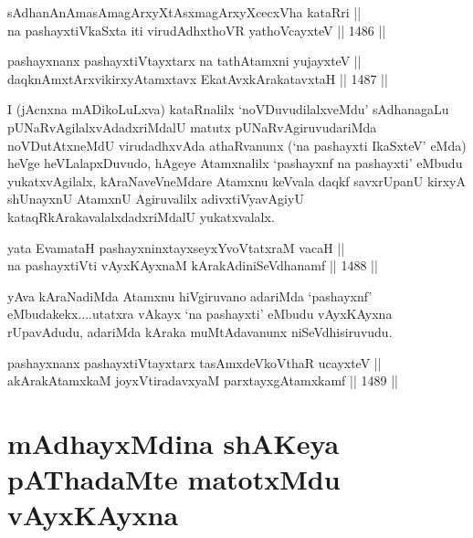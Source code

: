 \begin{shl}
sAdhanAnAmasAmagArxyXtAsxmagArxyXcecxVha kataRri || \\
na pashayxtiVkaSxta iti virudAdhxthoVR yathoVcayxteV ||  1486 ||  
\end{shl}
				
\begin{shl}
pashayxnanx pashayxtiVtayxtarx na tathA\s \s tamxni yujayxteV ||  \\
daqknAmxtArxvikirxyAtamxtavx EkatAvxkArakatavxtaH ||  1487 ||  
\end{shl}

\begin{artha}
I (jAcnxna mADikoLuLxva) kataRnalilx `noVDuvudilalxveMdu' sAdhanagaLu pUNaRvAgilalxvAdadxriMdalU matutx pUNaRvAgiruvudariMda noVDutAtxneMdU virudadhxvAda athaRvanunx (`na pashayxti IkaSxteV' eMda) heVge heVLalapxDuvudo, hAgeye Atamxnalilx `pashayxnf na pashayxti' eMbudu yukatxvAgilalx, kAraNaveVneMdare Atamxnu keVvala daqkf savxrUpanU kirxyA shUnayxnU AtamxnU Agiruvalilx adivxtiVyavAgiyU kataqRkArakavalalxdadxriMdalU yukatxvalalx.
\end{artha}


\begin{shl}
yata EvamataH pashayxninxtayxseyxYvoVtatxraM vacaH || \\
na pashayxtiVti vAyxKAyxnaM kArakAdiniSeVdhanamf ||  1488 ||  
\end{shl}

\begin{artha}
yAva kAraNadiMda Atamxnu hiVgiruvano adariMda `pashayxnf' eMbudakekx....utatxra vAkayx `na pashayxti' eMbudu vAyxKAyxna rUpavAdudu, adariMda kAraka muMtAdavanunx niSeVdhisiruvudu.
\end{artha}

\begin{shl}
pashayxnanx pashayxtiVtayxtarx tasAmxdeVkoV\s thaR ucayxteV ||  \\
akArakAtamxkaM joyxVtiradavxyaM parxtayxgAtamxkamf ||  1489 || 
\end{shl}

\section*{mAdhayxMdina shAKeya pAThadaMte matotxMdu vAyxKAyxna}



